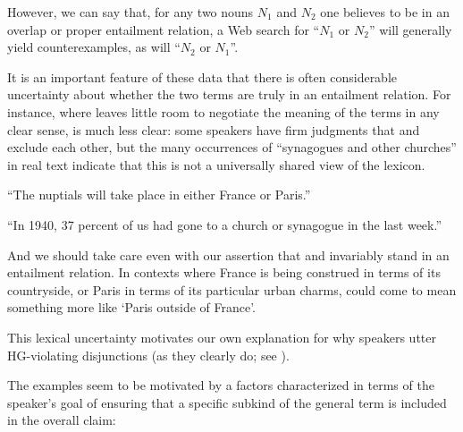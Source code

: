 \documentclass{article}
\begin{document}
\begin{examples}
\item However, we can say that, for any two nouns $N_{1}$ and $N_{2}$
  one believes to be in an overlap or proper entailment relation, a
  Web search for ``$N_{1}$ or $N_{2}$'' will generally yield
  counterexamples, as will ``$N_{2}$ or $N_{1}$''.%

\item\label{exclusive} It is an important feature of these data that
  there is often considerable uncertainty about whether the two terms
  are truly in an entailment relation. For instance, where
   leaves little room to negotiate the
  meaning of the terms in any clear sense,
   is much less clear: some
  speakers have firm judgments that  and 
  exclude each other, but the many occurrences of ``synagogues and
  other churches'' in real text indicate that this is not a
  universally shared view of the lexicon.

  \begin{examples}
  \item\label{franceorparis} ``The nuptials will take place in either
    France or Paris.''
  \item\label{churchorsynagogue} ``In 1940, 37 percent of us had gone
    to a church or synagogue in the last week.''
  \end{examples}

\item And we should take care even with our assertion that
   and  invariably stand in an entailment
  relation. In contexts where France is being construed in terms of
  its countryside, or Paris in terms of its particular urban charms,
   could come to mean something more like `Paris outside
  of France'.

\item This lexical uncertainty motivates our own explanation for why
  speakers utter HG-violating disjunctions (as they clearly do; see
  ).

\item The examples seem to be motivated by a factors characterized in
  terms of the speaker's goal of ensuring that a specific subkind of
  the general term is included in the overall claim:


\end{examples}
\end{document}
